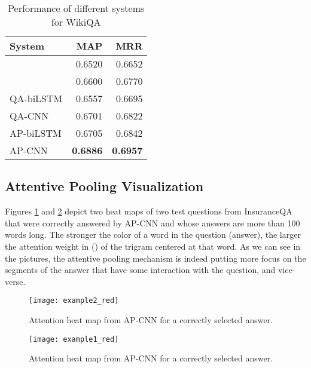 \documentclass{article}
\begin{document}
\begin{table}[ht!]
\caption{Performance of different systems for WikiQA}
\label{tab:wikiqa}
\vskip 0.15in
\begin{center}
\begin{small}
\begin{sc}
\begin{tabular}{lrr}
\hline
\abovespace\belowspace
\bf System & \bf MAP & \bf MRR \\
\hline
\citet{yang2015}  &  0.6520   & 0.6652 \\
\citet{yin2015}   &    0.6600   & 0.6770 \\ 
\hline
QA-biLSTM  &   0.6557    &  0.6695 \\
QA-CNN     &   0.6701    &  0.6822 \\ 
AP-biLSTM  &   0.6705    &  0.6842  \\
AP-CNN     & \bf 0.6886  & \bf 0.6957 \\

\hline
\end{tabular}
\end{sc}
\end{small}
\end{center}
\vskip -0.1in
\end{table}

\subsection{Attentive Pooling Visualization}
Figures \ref{example1} and \ref{example2} depict two heat maps of two test questions from InsuranceQA that were correctly answered by AP-CNN and whose answers are more than 100 words long.
The stronger the color of a word in the question  (answer),
the larger the attention weight in  () of the trigram centered at that word.
As we can see in the pictures,
the attentive pooling mechanism is indeed putting more focus on the segments of the answer that have some interaction with the question, and vice-verse.

\begin{figure}[ht]
\vskip 0.2in
\begin{center}
\centerline{\texttt{[image: example2\_red]}}
\caption{Attention heat map from AP-CNN for a correctly selected answer.}
\label{example1}
\end{center}
\vskip -0.2in
\end{figure}

\begin{figure}[ht]
\vskip 0.2in
\begin{center}
\centerline{\texttt{[image: example1\_red]}}
\caption{Attention heat map from AP-CNN for a correctly selected answer.}
\label{example2}
\end{center}
\vskip -0.2in
\end{figure}
\end{document}
